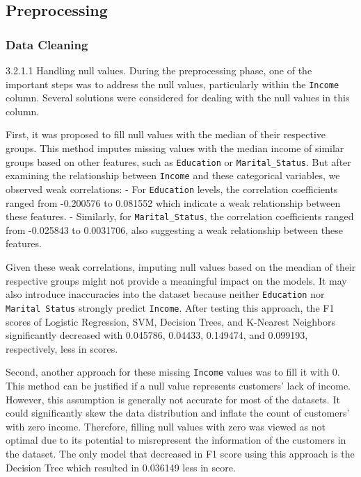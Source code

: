 \subsection{Preprocessing}

\subsubsection{Data Cleaning} 

    3.2.1.1 Handling null values. During the preprocessing phase, one of the important steps was to address the null values, particularly within the \texttt{Income} column. Several solutions were considered for dealing with the null values in this column. 

    First, it was proposed to fill null values with the median of their respective groups. This method imputes missing values with the median income of similar groups based on other features, such as \texttt{Education} or \texttt{Marital\_Status}. But after examining the relationship between \texttt{Income} and these categorical variables, we observed weak correlations:
        - For \texttt{Education} levels, the correlation coefficients ranged from -0.200576 to 0.081552 which indicate a weak relationship between these features.
        - Similarly, for \texttt{Marital\_Status}, the correlation coefficients ranged from -0.025843 to 0.0031706, also suggesting a weak relationship between these features.

    Given these weak correlations, imputing null values based on the meadian of their respective groups might not provide a meaningful impact on the models. It may also introduce inaccuracies into the dataset because neither \texttt{Education} nor \texttt{Marital Status} strongly predict \texttt{Income}. After testing this approach, the F1 scores of Logistic Regression, SVM, Decision Trees, and K-Nearest Neighbors significantly decreased with 0.045786, 0.04433, 0.149474, and 0.099193, respectively, less in scores.

    Second, another approach for these missing \texttt{Income} values was to fill it with 0. This method can be justified if a null value represents customers' lack of income. However, this assumption is generally not accurate for most of the datasets. It could significantly skew the data distribution and inflate the count of customers' with zero income. Therefore, filling null values with zero was viewed as not optimal due to its potential to misrepresent the information of the customers in the dataset. The only model that decreased in F1 score using this approach is the Decision Tree which resulted in 0.036149 less in score.

